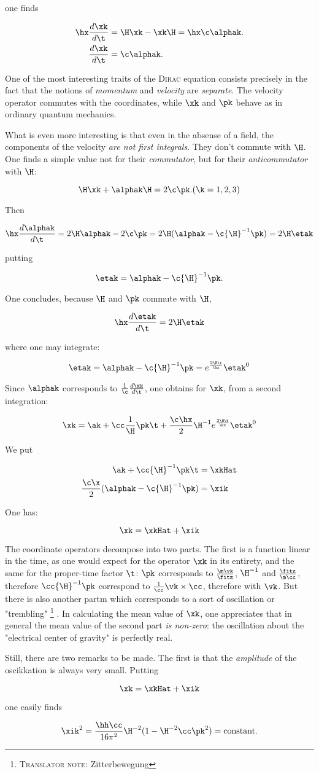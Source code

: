 \documentclass{article}
\newcommand{\uequ}[1]{
\begin{equation*}
#1
\end{equation*}
}
\newcommand{\TN}[1]{
\footnote{\sc{Translator note}: #1}
}
\newcommand{\const}[1]{#1}
\newcommand{\inv}[1]{\frac{1}{#1}}
\newcommand{\opinv}[1]{{#1}^{-1}}
\newcommand{\dXdY}[2]{
\frac{d{#1}}{d{#2}}
}
\newcommand{\ddt}[1]{\dXdY{#1}{\t}}
\renewcommand{\it}[1]{\textit{#1}}
\renewcommand{\sc}[1]{\textsc{#1}}
\renewcommand{\exp}[1]{\const{e}^{#1}}
\newcommand{\ifitz}[1]{\frac{#1}{\fitz}}
\newcommand{\fitzo}[1]{\frac{\fitz}{#1}}
\begin{document}
one finds
\uequ{
\begin{split}
\hx\ddt{\xk} &= \H\xk-\xk\H = \hx\c\alphak. \\
\ddt{\xk} &= \c\alphak.
\end{split}
}

One of the most interesting traits of the \sc{Dirac} equation consists precisely in the fact that the notions of \it{momentum} and \it{velocity} are \it{separate}. The velocity operator commutes with the coordinates, while $\xk$ and $\pk$ behave as in ordinary quantum mechanics.

What is even more interesting is that even in the absense of a field, the components of the velocity \it{are not first integrals}. They don't commute with $\H$. One finds a simple value not for their \it{commutator}, but for their \it{anticommutator} with $\H$:

\uequ{
\H\xk + \alphak\H = 2\c\pk. (\k = 1, 2, 3)
}
Then
\uequ{
\hx \ddt{\alphak} = 2\H\alphak - 2\c\pk = 2\H(\alphak - \c\opinv{\H}\pk) = 2\H\etak
}
putting
\uequ{
\etak = \alphak - \c\opinv{\H}\pk.
}
One concludes, because $\H$ and $\pk$ commute with $\H$,
\uequ{
\hx\ddt{\etak} = 2\H\etak
}
where one may integrate:
\uequ{
\etak = \alphak - \c\opinv{\H}\pk = \exp{\frac{2\H\t}{\hx}}\etak^0
}
Since $\alphak$ corresponds to $\inv{\c}\ddt{\xk}$, one obtains for $\xk$, from a second integration:
\uequ{
\xk = \ak + \cc\inv{\H}\pk\t + \frac{\c\hx}{2}\opinv{\H}\exp{\frac{2\H\t}{\hx}}\etak^0
}
We put
\uequ{
\begin{split}
\ak + \cc\opinv{\H}\pk\t &= \xkHat \\
\frac{\c\x}{2}(\alphak - \c\opinv{\H}\pk) &= \xik
\end{split}
}
One has:
\uequ{
\xk = \xkHat + \xik
}

The coordinate operators decompose into two parts. The first is a function linear in the time, as one would expect for the operator $\xk$ in its entirety, and the same for the proper-time factor $\t$: $\pk$ corresponds to $\ifitz{\m\vk}$, $\opinv{\H}$ and $\fitzo{\m\cc}$, therefore $\cc\opinv{\H}\pk$ correspond to $\inv{\cc}\vk\times\cc$, therefore with $\vk$.
But there is also another partm which corresponds to a sort of oscillation or "trembling" \TN{Zitterbewegung}. In calculating the mean value of $\xk$, one appreciates that in general the mean value of the second part \it{is non-zero}: the oscillation about the "electrical center of gravity" is perfectly real.

Still, there are two remarks to be made. The first is that the \it{amplitude} of the oscikkation is always very small. Putting
\uequ{
\xk = \xkHat + \xik
}
one easily finds
\uequ{
\xik^2 = \frac{\hh\cc}{16\pi^2}\H^{-2}(1 - \H^{-2}\cc\pk^2) = \text{constant}.}
\end{document}
